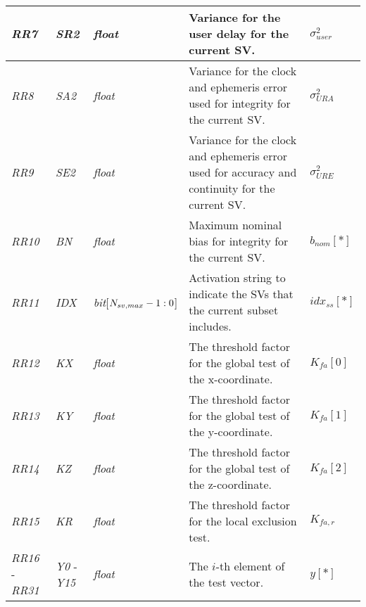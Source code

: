 \documentclass[11pt]{article}
\begin{document}
\begin{table}[htbp]
\begin{center}
\begin{tabular}{|m{1.25cm}|m{1.5cm}|m{1.75cm}|m{5.25cm}|m{1.5cm}|}
    \emph{RR7} & \emph{SR2} & \emph{float} & Variance for the user delay for the current SV. & $\sigma_{user}^2$\\ \hline

    \emph{RR8} & \emph{SA2} & \emph{float} & Variance for the clock and ephemeris error used for integrity for the current SV. & $\sigma_{URA}^2$\\ \hline

    \emph{RR9} & \emph{SE2} & \emph{float} & Variance for the clock and ephemeris error used for accuracy and continuity for the current SV. & $\sigma_{URE}^2$\\ \hline

    \emph{RR10} & \emph{BN} & \emph{float} & Maximum nominal bias for integrity for the current SV. & $b_{nom}[*]$\\ \hline

    \emph{RR11} & \emph{IDX} & \emph{bit}[$N_{sv,max}\newline-1:0$] & Activation string to indicate the SVs that the current subset includes. & $idx_{ss}[*]$\\ \hline

    \emph{RR12} & \emph{KX} & \emph{float} & The threshold factor for the global test of the x-coordinate. & $K_{fa}[0]$\\ \hline

    \emph{RR13} & \emph{KY} & \emph{float} & The threshold factor for the global test of the y-coordinate. & $K_{fa}[1]$\\ \hline

    \emph{RR14} & \emph{KZ} & \emph{float} & The threshold factor for the global test of the z-coordinate. & $K_{fa}[2]$\\ \hline

    \emph{RR15} & \emph{KR} & \emph{float} & The threshold factor for the local exclusion test. & $K_{fa,r}$\\ \hline

    \emph{RR16} - \emph{RR31} & \emph{Y0} - \emph{Y15} & \emph{float} & The $i$-th element of the test vector. & $y[*]$\\ \hline
  \end{tabular}
\end{center}
\end{table}
\end{document}
